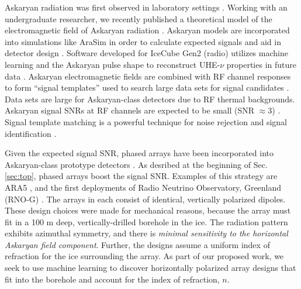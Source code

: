 \documentclass[../../main.tex]{subfiles}
\begin{document}
Askaryan radiation was first observed in laboratory settings \cite{saltzberg,10.1103/PhysRevD.74.043002,ask_ice}.  Working with an undergraduate researcher, we recently published a theoretical model of the electromagnetic field of Askaryan radiation \cite{PhysRevD.105.123019}. Askaryan models are incorporated into simulations like AraSim in order to calculate expected signals and aid in detector design \cite{dookayka2011characterizing,testbed,10.1140/epjc/s10052-020-7612-8}.  Software developed for IceCube Gen2 (radio) utilizes machine learning and the Askaryan pulse shape to reconstruct UHE-$\nu$ properties in future data \cite{10.1140/epjc/s10052-019-6971-5,10.1088/1748-0221/15/09/p09039,IFT}.  Askaryan electromagnetic fields are combined with RF channel responses to form ``signal templates'' used to search large data sets for signal candidates \cite{10.1088/1475-7516/2020/03/053,10.1016/j.astropartphys.2014.09.002}.  Data sets are large for Askaryan-class detectors due to RF thermal backgrounds.  Askaryan signal SNRs at RF channels are expected to be small (SNR $\approx 3$) \cite{10.3189/2015jog14j214,Barwick:2018497,ALLISON201963}.  Signal template matching is a powerful technique for noise rejection and signal identification \cite{10.1016/j.astropartphys.2015.04.002,10.1016/j.astropartphys.2014.09.002,barwick2016radio,10.1088/1475-7516/2020/03/053}. \\ \vspace{2.5mm}

Given the expected signal SNR, phased arrays have been incorporated into Askaryan-class prototype detectors \cite{Vieregg_2016,AVVA201746}.  As desribed at the beginning of Sec. \ref{sec:top}, phased arrays boost the signal SNR.  Examples of this strategy are ARA5 \cite{PhysRevD.105.122006}, and the first deployments of Radio Neutrino Observatory, Greenland (RNO-G) \cite{rno}.  The arrays in each consist of identical, vertically polarized dipoles.  These design choices were made for mechanical reasons, because the array must fit in a 100 m deep, vertically-drilled borehole in the ice.  The radiation pattern exhibits azimuthal symmetry, and there is \textit{minimal sensitivity to the horizontal Askaryan field component}.  Further, the designs assume a uniform index of refraction for the ice surrounding the array.  As part of our proposed work, we seek to use machine learning to discover horizontally polarized array designs that fit into the borehole and account for the index of refraction, $n$.  \\ \vspace{2.5mm}
\end{document}
